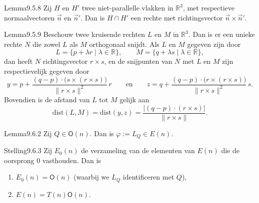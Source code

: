 \begin{res}{Lemma}{9.5.8}
Zij $H$ en $H'$ twee niet-parallelle vlakken in $\mathbb R^3$, met respectieve normaalvectoren $\vec n$ en $\vec n'$. Dan is $H\cap H'$ een rechte met richtingsvector $\vec n\times \vec n'$.
\end{res}

\begin{res}{Lemma}{9.5.9}
Beschouw twee kruisende rechten $L$ en $M$ in $\mathbb R^3$. Dan is er een unieke rechte $N$ die zowel $L$ als $M$ orthogonaal snijdt. Als $L$ en $M$ gegeven zijn door
\[
L=\{p+\lambda r \mid \lambda\in\mathbb R\}, \qquad M=\{q+\lambda s\mid \lambda\in\mathbb R\},
\]
dan heeft $N$ richtingsvector $r\times s$, en de snijpunten van $N$ met $L$ en $M$ zijn respectievelijk gegeven door
\[
y=p+\frac{(q-p)\cdot\big(s\times(r\times s)\big)}{\|r\times s\|^2}\,r \qquad\text{en}\qquad z=q+\frac{(q-p)\cdot\big(r\times(r\times s)\big)}{\|r\times s\|^2}\,s.
\]
Bovendien is de afstand van $L$ tot $M$ gelijk aan
\[
\mathrm{dist}(L,M)=\mathrm{dist}(y,z)=\frac{|(q-p)\cdot(r\times s)|}{\|r\times s\|}.
\]
\end{res}

\begin{res}{Lemma}{9.6.2}
Zij $Q\in \mathsf O(n)$. Dan is $\varphi:=L_Q\in E(n)$.
\end{res}

\begin{res}{Stelling}{9.6.3}
Zij $E_0(n)$ de verzameling van de elementen van $E(n)$ die de oorsprong $0$ vasthouden. Dan is
\begin{enumerate}[label=(\arabic*),leftmargin=1.8em,itemsep=1pt,topsep=1pt]
\item $E_0(n)=\mathsf O(n)$ (waarbij we $L_Q$ identificeren met $Q$),
\item $E(n)=T(n)\mathsf O(n)$.
\end{enumerate}
\end{res}